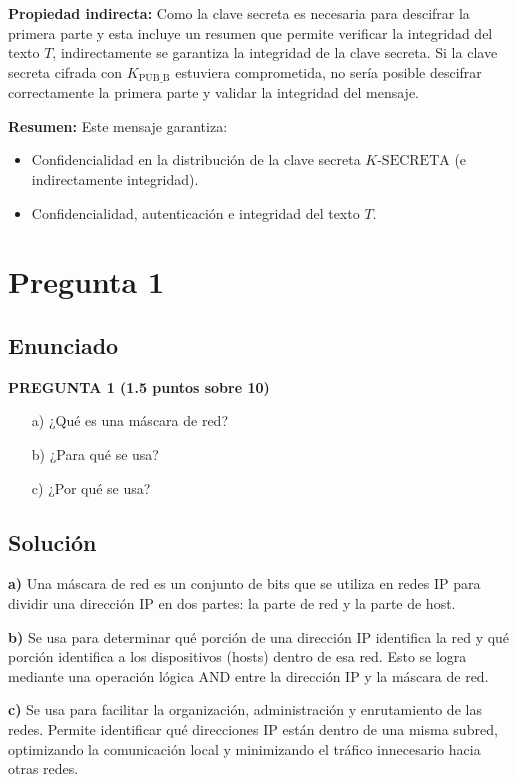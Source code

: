 \documentclass[12pt]{article}
\begin{document}
\textbf{Propiedad indirecta:} 
Como la clave secreta es necesaria para descifrar la primera parte y esta incluye un resumen que permite verificar la integridad del texto \(T\), indirectamente se garantiza la integridad de la clave secreta. Si la clave secreta cifrada con \(K_{\text{PUB\_B}}\) estuviera comprometida, no sería posible descifrar correctamente la primera parte y validar la integridad del mensaje.

\textbf{Resumen:} 
Este mensaje garantiza:
\begin{itemize}
    \item Confidencialidad en la distribución de la clave secreta \(K\text{-SECRETA}\) (e indirectamente integridad).
    \item Confidencialidad, autenticación e integridad del texto \(T\).
\end{itemize}

\section{Pregunta 1}

\subsection{Enunciado}

\textbf{PREGUNTA 1 (1.5 puntos sobre 10)} 
\begin{itemize}
    \item[a)] ¿Qué es una máscara de red? 
    \item[b)] ¿Para qué se usa? 
    \item[c)] ¿Por qué se usa?
\end{itemize}

\subsection{Solución}

\textbf{a)} Una máscara de red es un conjunto de bits que se utiliza en redes IP para dividir una dirección IP en dos partes: la parte de red y la parte de host.

\textbf{b)} Se usa para determinar qué porción de una dirección IP identifica la red y qué porción identifica a los dispositivos (hosts) dentro de esa red. Esto se logra mediante una operación lógica AND entre la dirección IP y la máscara de red.

\textbf{c)} Se usa para facilitar la organización, administración y enrutamiento de las redes. Permite identificar qué direcciones IP están dentro de una misma subred, optimizando la comunicación local y minimizando el tráfico innecesario hacia otras redes.
\end{document}
